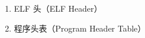 \begin{enumerate} [label=\arabic*)] 
\item ELF 头（ELF Header）




\item 程序头表（Program Header Table）




\end{enumerate}
